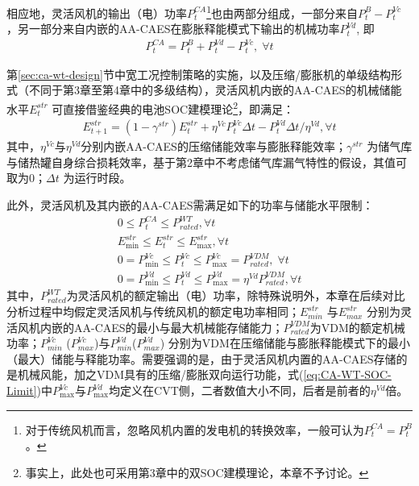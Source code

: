 相应地，灵活风机的输出（电）功率$P_t^{CA}$\footnote{对于传统风机而言，忽略风机内置的发电机的转换效率，一般可认为$P_t^{CA} = P_t^B$。}也由两部分组成，一部分来自$P_t^B - P_t^{Vc}$，另一部分来自内嵌的AA-CAES在膨胀释能模式下输出的机械功率$P_t^{Vd}$, 即
\begin{gather}
\label{eq:CA-WT-Power-Gen}
P_t^{CA} = P_t^B + P_t^{Vd} - P_t^{Vc},\;\forall t
\end{gather}


第\ref{sec:ca-wt-design}节中宽工况控制策略的实施，以及压缩/膨胀机的单级结构形式（不同于第3章至第4章中的多级结构），灵活风机内嵌的AA-CAES的机械储能水平$E_t^{str}$ 可直接借鉴经典的电池SOC建模理论\footnote{事实上，此处也可采用第3章中的双SOC建模理论，本章不予讨论。}，即满足：
\begin{gather}
\label{eq:CA-WT-SOC}
E_{t + 1}^{str} = ({1 - {\gamma ^{str}}})E_t^{str} + {\eta ^{Vc}}P_t^{Vc}\Delta t - P_t^{Vd}\Delta t/{\eta ^{Vd}},\forall t
\end{gather}
其中，${\eta ^{Vc}}$与${\eta ^{Vd}}$分别内嵌AA-CAES的压缩储能效率与膨胀释能效率；${\gamma ^{str}}$ 为储气库与储热罐自身综合损耗效率，基于第2章中不考虑储气库漏气特性的假设，其值可取为0；$\Delta t$ 为运行时段。

此外，灵活风机及其内嵌的AA-CAES需满足如下的功率与储能水平限制：
\begin{subequations}
\label{eq:CA-WT-SOC-Limit}
\begin{gather}
0 \le P_t^{CA} \le P_{rated}^{WT}, \forall t \\
E_{\min }^{str} \le E_t^{str} \le E_{\max }^{str},\forall t \\
0 = P_{\min }^{Vc} \le P_t^{Vc} \le P_{\max }^{Vc} = P_{rated}^{VDM},\;\forall t \\
0 = P_{\min }^{Vd} \le P_t^{Vd} \le P_{\max }^{Vd} = {\eta ^{Vd}}P_{rated}^{VDM},\forall t
\end{gather}
\end{subequations}
其中，$P_{rated}^{WT}$为灵活风机的额定输出（电）功率，除特殊说明外，本章在后续对比分析过程中均假定灵活风机与传统风机的额定电功率相同；$E_{min}^{str}$ 与$E_{max}^{str}$ 分别为灵活风机内嵌的AA-CAES的最小与最大机械能存储能力；$P_{rated}^{VDM}$为VDM的额定机械功率；$P_{min}^{Vc}$ ($P_{max}^{Vc}$)与$P_{min}^{Vd}$($P_{max}^{Vd}$) 分别为VDM在压缩储能与膨胀释能模式下的最小（最大）储能与释能功率。需要强调的是，由于灵活风机内置的AA-CAES存储的是机械风能，加之VDM具有的压缩/膨胀双向运行功能，式(\ref{eq:CA-WT-SOC-Limit})中$P_{\max }^{Vc}$与$P_{\max }^{Vd}$均定义在CVT侧，二者数值大小不同，后者是前者的$\eta^{Vd}$倍。

